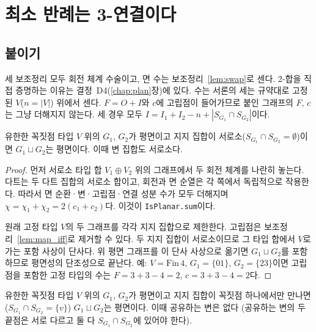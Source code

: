\chapter{최소 반례는 3-연결이다}
\label{chap:reduce}

\section{붙이기}

세 보조정리 모두 회전 체계 수술이고, 면 수는 보조정리~\ref{lem:swap}로 센다. 2-합을 직접 증명하는
이유는 결정~D4(\ref{chap:plan}장)에 있다. 수는 서론의 세는 규약대로 고정된 \(V\)(\(n = |V|\)) 위에서
센다. \(F = O + I\)와 \(c\)에 고립점이 들어가므로 붙인 그래프의 \(F\), \(c\)는 그냥 더해지지 않는다.
세 경우 모두 \(I = I_1 + I_2 - n + |S_{G_1} \cap S_{G_2}|\)이다.

\begin{lemma}[서로소 합]
\label{lem:sum0}
\leanok
유한한 꼭짓점 타입 \(V\) 위의 \(G_1\), \(G_2\)가 평면이고 지지 집합이 서로소(\(S_{G_1} \cap S_{G_2} = \emptyset\))이면 \(G_1 \sqcup G_2\)는
평면이다. 이때 변 집합도 서로소다.
\end{lemma}

\begin{proof}
\leanok
먼저 서로소 타입 합 \(V_1 \oplus V_2\) 위의 그래프에서 두 회전 체계를 나란히 놓는다. 다트는 두 다트
집합의 서로소 합이고, 회전과 면 순열은 각 쪽에서 독립적으로 작용한다. 따라서 면 순환·변·고립점·연결
성분 수가 모두 더해지며 \(\chi = \chi_1 + \chi_2 = 2(c_1 + c_2)\)다. 이것이 \texttt{IsPlanar.sum}이다.

원래 고정 타입 \(V\)의 두 그래프를 각각 지지 집합으로 제한한다. 고립점은 보조정리~\ref{lem:map_iff}로
제거할 수 있다. 두 지지 집합이 서로소이므로 그 타입 합에서 \(V\)로 가는 포함 사상이 단사다. 위 평면
그래프를 이 단사 사상으로 옮기면 \(G_1 \sqcup G_2\)를 포함하므로 평면성의 단조성으로 끝난다.
예: \(V = \mathrm{Fin}\,4\), \(G_1 = \{01\}\), \(G_2 = \{23\}\)이면 고립점을 포함한 고정 타입의 수는
\(F = 3 + 3 - 4 = 2\), \(c = 3 + 3 - 4 = 2\)다.
\end{proof}

\begin{lemma}
\label{lem:sum1}
\leanok
유한한 꼭짓점 타입 \(V\) 위의 \(G_1\), \(G_2\)가 평면이고 지지 집합이 꼭짓점 하나에서만 만나면(\(S_{G_1} \cap S_{G_2} = \{v\}\))
\(G_1 \sqcup G_2\)는 평면이다. 이때 공유하는 변은 없다 (공유하는 변의 두 끝점은 서로 다르고 둘 다
\(S_{G_1} \cap S_{G_2}\)에 있어야 한다).
\end{lemma}

